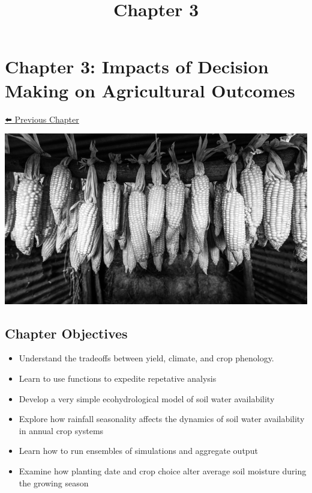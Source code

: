 \documentclass[11pt]{article}
\title{Chapter 3}
\makeatletter
\def\maxwidth{\ifdim\Gin@nat@width>\linewidth\linewidth
    \else\Gin@nat@width\fi}
\let\Oldincludegraphics\includegraphics
\renewcommand{\includegraphics}[1]{\Oldincludegraphics[width=.8\maxwidth]{#1}}
\providecommand{\tightlist}{%
      \setlength{\itemsep}{0pt}\setlength{\parskip}{0pt}}
\makeatother
\begin{document}
    
    
    \maketitle
    
    

    
    \hypertarget{chapter-3-impacts-of-decision-making-on-agricultural-outcomes}{%
\section{Chapter 3: Impacts of Decision Making on Agricultural
Outcomes}\label{chapter-3-impacts-of-decision-making-on-agricultural-outcomes}}

\href{Chapter\%202.ipynb}{⬅️ Previous Chapter}

\includegraphics{../assets/farm_02.png}

\hypertarget{chapter-objectives}{%
\subsection{Chapter Objectives}\label{chapter-objectives}}

\begin{itemize}
\tightlist
\item
  Understand the tradeoffs between yield, climate, and crop phenology.
\item
  Learn to use functions to expedite repetative analysis
\item
  Develop a very simple ecohydrological model of soil water availability
\item
  Explore how rainfall seasonality affects the dynamics of soil water
  availability in annual crop systems
\item
  Learn how to run ensembles of simulations and aggregate output
\item
  Examine how planting date and crop choice alter average soil moisture
  during the growing season
\end{itemize}
\end{document}
